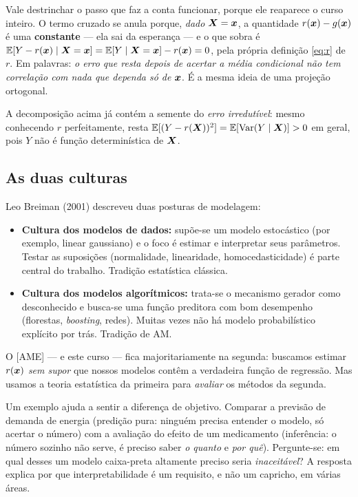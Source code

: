 \documentclass[11pt,a4paper]{article}
\begin{document}
\noindent
Vale destrinchar o passo que faz a conta funcionar, porque ele reaparece o curso
inteiro. O termo cruzado se anula porque, \emph{dado} $\bm{X}=\bm{x}$, a quantidade
$r(\bm{x})-g(\bm{x})$ é uma \textbf{constante} --- ela sai da esperança --- e o que sobra é
$\mathbb{E}[Y-r(\bm{x})\mid\bm{X}=\bm{x}]=\mathbb{E}[Y\mid\bm{X}=\bm{x}]-r(\bm{x})=0$, pela própria definição
\eqref{eq:r} de $r$. Em palavras: \emph{o erro que resta depois de acertar a média
condicional não tem correlação com nada que dependa só de $\bm{x}$}. É a mesma ideia de
uma projeção ortogonal.

\begin{observacao}
A decomposição acima já contém a semente do \emph{erro irredutível}: mesmo
conhecendo $r$ perfeitamente, resta $\mathbb{E}[(Y-r(\bm{X}))^2]=\mathbb{E}[\operatorname{Var}(Y\mid\bm{X})]>0$ em
geral, pois $Y$ não é função determinística de $\bm{X}$.
\end{observacao}

\subsection{As duas culturas}
Leo Breiman (2001) descreveu duas posturas de modelagem:
\begin{itemize}[leftmargin=1.4cm]
  \item \textbf{Cultura dos modelos de dados:} supõe-se um modelo estocástico
        (por exemplo, linear gaussiano) e o foco é estimar e interpretar seus
        parâmetros. Testar as suposições (normalidade, linearidade,
        homocedasticidade) é parte central do trabalho. Tradição estatística
        clássica.
  \item \textbf{Cultura dos modelos algorítmicos:} trata-se o mecanismo gerador
        como desconhecido e busca-se uma função preditora com bom desempenho
        (florestas, \emph{boosting}, redes). Muitas vezes não há modelo
        probabilístico explícito por trás. Tradição de AM.
\end{itemize}
O [AME] --- e este curso --- fica majoritariamente na segunda: buscamos estimar
$r(\bm{x})$ \emph{sem supor} que nossos modelos contêm a verdadeira função de regressão.
Mas usamos a teoria estatística da primeira para \emph{avaliar} os métodos da
segunda.

Um exemplo ajuda a sentir a diferença de objetivo. Comparar a previsão de demanda de
energia (predição pura: ninguém precisa entender o modelo, só acertar o número) com
a avaliação do efeito de um medicamento (inferência: o número sozinho não serve, é
preciso saber \emph{o quanto} e \emph{por quê}). Pergunte-se: em qual desses um
modelo caixa-preta altamente preciso seria \emph{inaceitável}? A resposta explica por
que interpretabilidade é um requisito, e não um capricho, em várias áreas.
\end{document}
